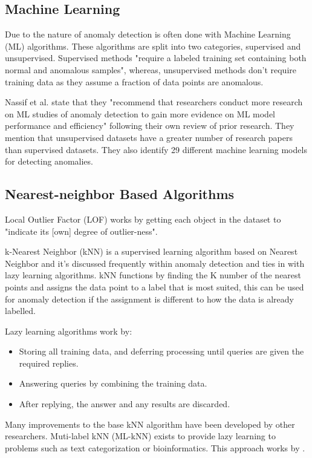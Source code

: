 \documentclass[journal]{IEEEtran}
\begin{document}
\subsection{Machine Learning}
\noindent Due to the nature of anomaly detection is often done with Machine Learning (ML) algorithms\cite{Omar2013}\cite{Misra2020}\cite{Zong2018}. These algorithms are split into two categories, supervised and unsupervised\cite{Omar2013}. Supervised methods "require a labeled training set containing both normal and anomalous samples", whereas, unsupervised methods don't require training data as they assume a fraction of data points are anomalous\cite{Omar2013}.

Nassif et al. state that they "recommend that researchers conduct more research on ML studies of anomaly detection to gain more evidence on ML model performance and efficiency" following their own review of prior research. They mention that unsupervised datasets have a greater number of research papers than supervised datasets. They also identify 29 different machine learning models for detecting anomalies\cite{Nassif2021}.

\subsection{Nearest-neighbor Based Algorithms}
\noindent Local Outlier Factor (LOF) works by getting each object in the dataset to "indicate its [own] degree of outlier-ness"\cite{Breunig2000}.

k-Nearest Neighbor (kNN) is a supervised learning algorithm based on Nearest Neighbor and it's discussed frequently within anomaly detection and ties in with lazy learning algorithms. kNN functions by finding the K number of the nearest points and assigns the data point to a label that is most suited, this can be used for anomaly detection if the assignment is different to how the data is already labelled\cite{Cover1967}.

Lazy learning algorithms work by\cite{Wettschereck1997}:
\begin{itemize}
    \item Storing all training data, and deferring processing until queries are given the required replies.
    \item Answering queries by combining the training data.
    \item After replying, the answer and any results are discarded.
\end{itemize}

Many improvements to the base kNN algorithm have been developed by other researchers. Muti-label kNN (ML-kNN) exists to provide lazy learning to problems such as text categorization or bioinformatics. This approach works by \cite{Zhang2005}.
\end{document}
